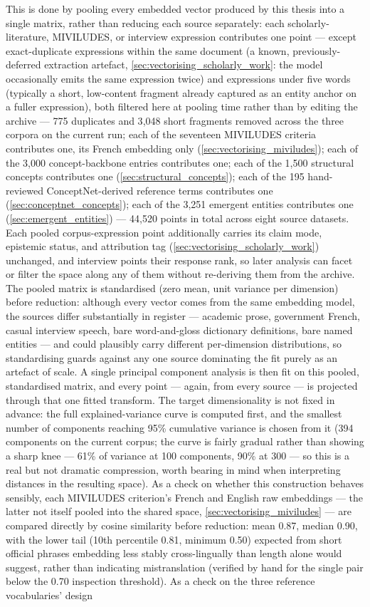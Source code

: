 This is done by pooling every embedded vector produced by this thesis into a single matrix, rather than reducing each source separately: each scholarly-literature, MIVILUDES, or interview expression contributes one point — except exact-duplicate expressions within the same document (a known, previously-deferred extraction artefact, \ref{sec:vectorising_scholarly_work}: the model occasionally emits the same expression twice) and expressions under five words (typically a short, low-content fragment already captured as an entity anchor on a fuller expression), both filtered here at pooling time rather than by editing the archive — 775 duplicates and 3{,}048 short fragments removed across the three corpora on the current run; each of the seventeen MIVILUDES criteria contributes one, its French embedding only (\ref{sec:vectorising_miviludes}); each of the 3,000 concept-backbone entries contributes one; each of the 1,500 structural concepts contributes one (\ref{sec:structural_concepts}); each of the 195 hand-reviewed ConceptNet-derived reference terms contributes one (\ref{sec:conceptnet_concepts}); each of the 3,251 emergent entities contributes one (\ref{sec:emergent_entities}) — 44{,}520 points in total across eight source datasets. Each pooled corpus-expression point additionally carries its claim mode, epistemic status, and attribution tag (\ref{sec:vectorising_scholarly_work}) unchanged, and interview points their response rank, so later analysis can facet or filter the space along any of them without re-deriving them from the archive. The pooled matrix is standardised (zero mean, unit variance per dimension) before reduction: although every vector comes from the same embedding model, the sources differ substantially in register — academic prose, government French, casual interview speech, bare word-and-gloss dictionary definitions, bare named entities — and could plausibly carry different per-dimension distributions, so standardising guards against any one source dominating the fit purely as an artefact of scale. A single principal component analysis is then fit on this pooled, standardised matrix, and every point — again, from every source — is projected through that one fitted transform. The target dimensionality is not fixed in advance: the full explained-variance curve is computed first, and the smallest number of components reaching 95\% cumulative variance is chosen from it (394 components on the current corpus; the curve is fairly gradual rather than showing a sharp knee — 61\% of variance at 100 components, 90\% at 300 — so this is a real but not dramatic compression, worth bearing in mind when interpreting distances in the resulting space). As a check on whether this construction behaves sensibly, each MIVILUDES criterion's French and English raw embeddings — the latter not itself pooled into the shared space, \ref{sec:vectorising_miviludes} — are compared directly by cosine similarity before reduction: mean 0.87, median 0.90, with the lower tail (10th percentile 0.81, minimum 0.50) expected from short official phrases embedding less stably cross-lingually than length alone would suggest, rather than indicating mistranslation (verified by hand for the single pair below the 0.70 inspection threshold). As a check on the three reference vocabularies' design 